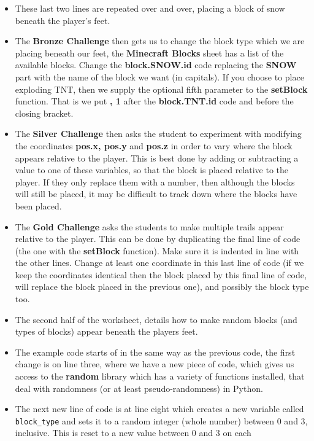\documentclass{geocraft-lesson-plan}
\begin{document}
\begin{itemize}
\item These last two lines are repeated over and over, placing a block of snow beneath the player's feet.
\item The \textbf{Bronze Challenge} then gets us to change the block type which we are placing beneath our feet, the
  \textbf{Minecraft Blocks} sheet has a list of the available blocks. Change the \textbf{block.SNOW.id} code replacing
  the \textbf{SNOW} part with the name of the block we want (in capitals). If you choose to place exploding TNT, then
  we supply the optional fifth parameter to the \textbf{setBlock} function. That is we put \textbf{, 1} after the
  \textbf{block.TNT.id} code and before the closing bracket.
\item The \textbf{Silver Challenge} then asks the student to experiment with modifying the coordinates \textbf{pos.x,
    pos.y} and \textbf{pos.z} in order to vary where the block appears relative to the player. This is best done by
  adding or subtracting a value to one of these variables, so that the block is placed relative to the player. If they
  only replace them with a number, then although the blocks will still be placed, it may be difficult to track down
  where the blocks have been placed.
\item The \textbf{Gold Challenge} asks the students to make multiple trails appear relative to the player. This can be
  done by duplicating the final line of code (the one with the \textbf{setBlock} function). Make sure it is indented in
  line with the other lines. Change at least one coordinate in this last line of code (if we keep the coordinates
  identical then the block placed by this final line of code, will replace the block placed in the previous one), and
  possibly the block type too. 
\item The second half of the worksheet, details how to make random blocks (and types of blocks) appear beneath the
  players feet.
\item The example code starts of in the same way as the previous code, the first change is on line three, where we have
  a new piece of code, which gives us access to the \textbf{random} library which has a variety of functions installed,
  that deal with randomness (or at least pseudo-randomness) in Python.
\item The next new line of code is at line eight which creates a new variable called \lstinline{block_type} and sets it to
  a random integer (whole number) between 0 and 3, inclusive. This is reset to a new value between 0 and 3 on each

\end{itemize}
\end{document}
